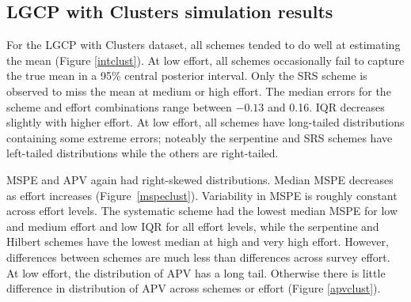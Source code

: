 \documentclass[review]{elsarticle}
\begin{document}
\subsection{LGCP with Clusters simulation results}

For the LGCP with Clusters dataset, all schemes tended to do well at
estimating the mean (Figure \ref{intclust}). At low effort, all schemes
occasionally fail to capture the true mean in a 95\% central posterior
interval. Only the SRS scheme is observed to miss the mean at medium or high
effort. The median errors for the scheme and effort combinations range
between \(-0.13\) and 0.16. IQR decreases slightly with higher effort. At low
effort, all schemes have long-tailed distributions containing some extreme
errors; noteably the serpentine and SRS schemes have left-tailed distributions
while the others are right-tailed.

MSPE and APV again had right-skewed distributions. Median MSPE decreases as
effort increases (Figure~\ref{mspeclust}). Variability in MSPE is roughly
constant across effort levels. The systematic scheme had the lowest median
MSPE for low and medium effort and low IQR for all effort levels, while the
serpentine and Hilbert schemes have the lowest median at high and very high
effort. However, differences between schemes are much less than differences
across survey effort. At low effort, the distribution of APV has a long tail.
Otherwise there is little difference in distribution of APV across schemes or
effort (Figure \ref{apvclust}).
\end{document}
